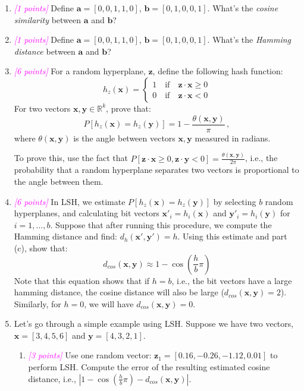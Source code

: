 \documentclass{exam}
\newcommand{\R}{\mathbb{R}} %
\newcommand{\xv}{\mathbf{x}}
\newcommand{\av}{\mathbf{a}}
\newcommand{\bv}{\mathbf{b}}
\newcommand{\yv}{\mathbf{y}}
\newcommand{\zv}{\mathbf{z}}
\newcommand{\grade}[1]{\small\textcolor{magenta}{\emph{[#1 points]}} \normalsize}
\begin{document}
\begin{enumerate}[label=(\alph*)]
    \item\grade{1} Define $\av = [0,0,1,1,0]$, $\bv = [0,1,0,0,1]$. What's the \textit{cosine similarity} between $\av$ and $\bv$?
    

    \vspace{5em}
    \item\grade{1} Define $\av = [0,0,1,1,0]$, $\bv = [0,1,0,0,1]$. What's the \textit{Hamming distance} between $\av$ and $\bv$?
    

    \vspace{1em}
    
    
    \newpage
    \item \grade{6} For a random hyperplane, $\zv$, define the following hash function: 
    $$
h_{z}(\xv) =
\begin{cases}
1 \quad \text{if} \quad \zv \cdot \xv \ge 0  \\
0 \quad \text{if} \quad \zv \cdot \xv < 0
\end{cases}
$$
For two vectors $\xv,\yv \in \R^k$, prove that:
$$P[h_z(\xv) = h_z(\yv)] = 1 - \frac{\theta(\xv,\yv)}{\pi} \, ,$$
where $\theta(\xv,\yv)$ is the angle between vectors $\xv, \yv$ measured in radians. 

To prove this, use the fact that $P[\zv \cdot \xv \ge 0, \zv \cdot \yv < 0 ] = \frac{\theta(\xv,\yv)}{2\pi}$, i.e., the probability that a random hyperplane separates two vectors is proportional to the angle between them. 

\newpage
\item \grade{6} In LSH, we estimate $P[h_z(\xv)=h_z(\yv)]$ by selecting $b$ random hyperplanes, and calculating bit vectors $\xv'_i = h_i(\xv)$ and $\yv'_i = h_i(\yv)$ for $i=1,\dots,b$. Suppose that after running this procedure, we compute the Hamming distance and find: $d_h(\xv',\yv')=h$. Using this estimate and part (c), show that:
$$ d_{cos}(\xv,\yv) \approx 1 - \cos\left(\frac{h}{b} \pi\right)$$
Note that this equation shows that if $h=b$, i.e., the bit vectors have a large hamming distance, the cosine distance will also be large ($d_{cos}(\xv,\yv) = 2$). Similarly, for $h=0$, we will have $d_{cos}(\xv,\yv) = 0$.

    
    \newpage
    \item Let's go through a simple example using LSH. Suppose we have two vectors, $\xv = [3,4,5,6]$ and $\yv=[4,3,2,1]$.
    \begin{enumerate}[label=\roman*.]
        \item \grade{3} Use one random vector: $\zv_1 = [0.16, -0.26, -1.12, 0.01]$ to perform LSH. Compute the error of the resulting estimated cosine distance, i.e., $|1 - \cos\left(\frac{h}{b}\pi\right) - d_{cos}(\xv,\yv)|$. 
        

\end{enumerate}
\end{enumerate}
\end{document}
